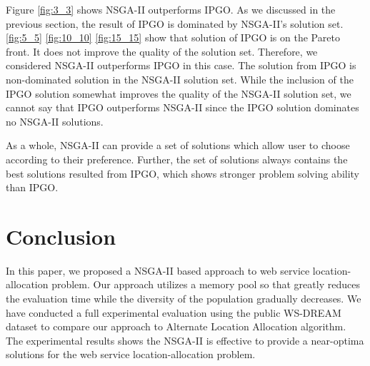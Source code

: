 \documentclass{llncs}
\begin{document}
Figure \ref{fig:3_3} shows NSGA-II outperforms IPGO. As we discussed in the previous section, the 
result of IPGO is dominated by NSGA-II's solution set. \ref{fig:5_5} \ref{fig:10_10} \ref{fig:15_15} show that solution of IPGO is on the Pareto front. It does not improve the quality of the solution
set. Therefore, we considered NSGA-II outperforms IPGO in this case. The solution from IPGO is non-dominated solution in the NSGA-II solution set. While the inclusion
of the IPGO solution somewhat improves the quality of the NSGA-II solution set, we cannot say that IPGO outperforms NSGA-II since the 
IPGO solution dominates no NSGA-II solutions.

As a whole, NSGA-II can provide a set of solutions which allow user to choose according to their preference. Further, the set of 
solutions always contains the best solutions resulted from IPGO, which shows stronger problem solving ability than IPGO.


\section{Conclusion}
In this paper, we proposed a NSGA-II based approach to web service location-allocation problem. 
Our approach utilizes a memory pool so that
greatly reduces the evaluation time while the diversity of the population gradually decreases. We have conducted a full experimental evaluation using the public WS-DREAM dataset to compare our approach to Alternate Location Allocation algorithm. 
The experimental results shows the NSGA-II is effective to provide a near-optima solutions for the web service location-allocation problem.




\end{document}
